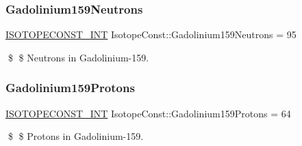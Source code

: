 \subsubsection{\texorpdfstring{Gadolinium159\+Neutrons}{Gadolinium159Neutrons}}
{\footnotesize\ttfamily \mbox{\hyperlink{group___isotope_const-_macros_ga5f18360b3e99483a35c32d789e62621c}{I\+S\+O\+T\+O\+P\+E\+C\+O\+N\+S\+T\+\_\+\+I\+NT}} Isotope\+Const\+::\+Gadolinium159\+Neutrons = 95}

\$ \$ Neutrons in Gadolinium-\/159. \mbox{\label{group___isotope_const-_gadolinium-_gd159_gad7a2afe566db859569f31e3359955d09}} 
\subsubsection{\texorpdfstring{Gadolinium159\+Protons}{Gadolinium159Protons}}
{\footnotesize\ttfamily \mbox{\hyperlink{group___isotope_const-_macros_ga5f18360b3e99483a35c32d789e62621c}{I\+S\+O\+T\+O\+P\+E\+C\+O\+N\+S\+T\+\_\+\+I\+NT}} Isotope\+Const\+::\+Gadolinium159\+Protons = 64}

\$ \$ Protons in Gadolinium-\/159. 